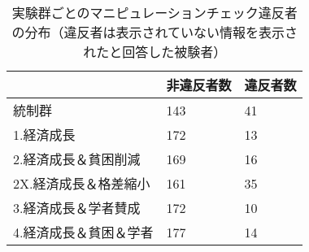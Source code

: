 \begin{table}[ht]
\centering
\caption{実験群ごとのマニピュレーションチェック違反者の分布（違反者は表示されていない情報を表示されたと回答した被験者）} 
\label{mchecktab}
\begin{tabular}{lll}
  \hline
 & 非違反者数 & 違反者数 \\ 
  \hline
統制群 & 143 &  41 \\ 
  1.経済成長 & 172 &  13 \\ 
  2.経済成長＆貧困削減 & 169 &  16 \\ 
  2X.経済成長＆格差縮小 & 161 &  35 \\ 
  3.経済成長＆学者賛成 & 172 &  10 \\ 
  4.経済成長＆貧困＆学者 & 177 &  14 \\ 
   \hline
\end{tabular}
\end{table}
